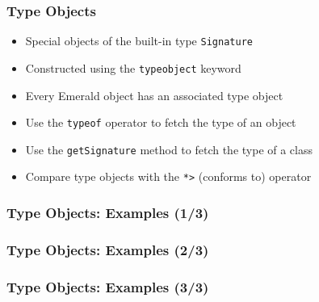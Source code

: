 \begin{frame}

\frametitle{Type Objects}

\begin{itemize}

\item Special objects of the built-in type \lstinline{Signature}

\item Constructed using the \lstinline{typeobject} keyword

\item Every Emerald object has an associated type object

\item Use the \lstinline{typeof} operator to fetch the type of an object

\item Use the \lstinline{getSignature} method to fetch the type of a class

\item Compare type objects with the \lstinline{*>} (conforms to)
operator

\end{itemize}

\end{frame}

\begin{frame}[fragile]

\frametitle{Type Objects: Examples (1/3)}


\end{frame}

\begin{frame}[fragile]

\frametitle{Type Objects: Examples (2/3)}


\end{frame}

\begin{frame}[fragile]

\frametitle{Type Objects: Examples (3/3)}


\end{frame}
